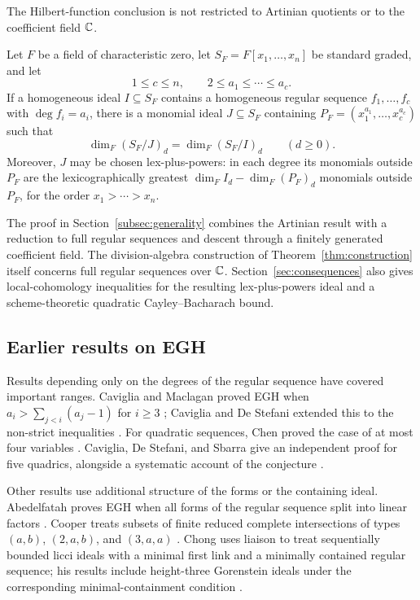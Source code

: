 The Hilbert-function conclusion is not restricted to Artinian quotients
or to the coefficient field \(\mathbb C\).

\begin{corollary}
\label{cor:characteristic-zero}
Let \(F\) be a field of characteristic zero, let
\(S_F=F[x_1,\ldots,x_n]\) be standard graded, and let
\[
 1\le c\le n,\qquad 2\le a_1\le\cdots\le a_c.
\]
If a homogeneous ideal \(I\subseteq S_F\) contains a homogeneous regular
sequence \(f_1,\ldots,f_c\) with \(\deg f_i=a_i\), there is a monomial ideal
\(J\subseteq S_F\) containing
\(P_F=(x_1^{a_1},\ldots,x_c^{a_c})\) such that
\[
 \dim_F(S_F/J)_d=\dim_F(S_F/I)_d\qquad(d\ge0).
\]
Moreover, \(J\) may be chosen lex-plus-powers: in each degree its monomials
outside \(P_F\) are the lexicographically greatest
\(\dim_F I_d-\dim_F(P_F)_d\) monomials outside \(P_F\), for the order
\(x_1>\cdots>x_n\).
\end{corollary}

The proof in Section~\ref{subsec:generality} combines the Artinian result
with a reduction to full regular sequences and descent through a finitely
generated coefficient field. The division-algebra construction of
Theorem~\ref{thm:construction} itself concerns full regular sequences over
\(\mathbb C\). Section~\ref{sec:consequences} also gives local-cohomology
inequalities for the resulting lex-plus-powers ideal and a
scheme-theoretic quadratic Cayley--Bacharach bound.

\subsection{Earlier results on EGH}

Results depending only on the degrees of the regular sequence have
covered important ranges. Caviglia and Maclagan proved EGH when
$a_i>\sum_{j<i}(a_j-1)$ for $i\ge3$ \cite{CM08}; Caviglia and De Stefani
extended this to the non-strict inequalities
\cite[Theorem~A]{CDeS20}. For quadratic sequences, Chen proved the case
of at most four variables \cite[Theorem~2.2]{Chen12}. Caviglia,
De Stefani, and Sbarra give an independent proof for five quadrics,
alongside a systematic account of the conjecture
\cite[Theorem~4.14]{CDS22}.

Other results use additional structure of the forms or the containing
ideal. Abedelfatah proves EGH when all forms of the regular sequence
split into linear factors \cite[Corollary~4.3]{Abedelfatah15}.
Cooper treats subsets of finite reduced complete intersections of
types $(a,b)$, $(2,a,b)$, and $(3,a,a)$ \cite{Cooper12}.
Chong uses liaison to treat sequentially bounded licci ideals with a
minimal first link and a minimally contained regular sequence; his
results include height-three Gorenstein ideals under the corresponding
minimal-containment condition
\cite[Theorem~3 and Corollary~11]{Chong16}.

